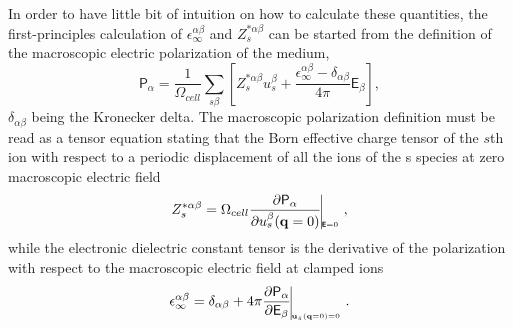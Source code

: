 In order to have little bit of intuition on how to calculate these quantities, the first-principles calculation of $\epsilon_{\infty}^{\alpha\beta}$ and $Z_{s}^{*\alpha\beta}$ can be started from the definition of the macroscopic electric polarization of the medium, 
\begin{equation}
 \mathsf{P}_{\alpha}=\frac{1}{\Omega_{cell}}\sum_{s\beta}\left[Z^{*\alpha\beta}_{s}u_{s}^{\beta}+\frac{\epsilon_{\infty}^{\alpha\beta}-\delta_{\alpha\beta}}{4\pi}\mathsf{E}_{\beta}\right],
\end{equation}
$\delta_{\alpha\beta}$ being the Kronecker delta. The macroscopic polarization definition must be read as a tensor equation stating that the Born effective charge tensor of the $s$th ion with respect to a periodic displacement of 
all the ions of the s species at zero macroscopic electric field
\begin{equation}
 Z^{*\alpha\beta}_{s}=\Omega_{cell}\frac{\partial \mathsf{P}_{\alpha}}{\partial u_{s}^{\beta}(\mathbf{q}=0)}\vline_{_{_{_{_{_{_{_{\boldsymbol{\mathsf{E}}=0}}}}}}}},
\end{equation}
while the electronic dielectric constant tensor is the derivative of the polarization with respect to the macroscopic electric field at clamped ions
\begin{equation}
 \epsilon_{\infty}^{\alpha\beta}=\delta_{\alpha\beta}+4\pi\frac{\partial\mathsf{P}_{\alpha}}{\partial\mathsf{E}_{\beta}}\vline_{_{_{_{_{_{_{_{\mathbf{u}_{s}(\mathbf{q}=0)=0}}}}}}}}.
\end{equation}
\\

